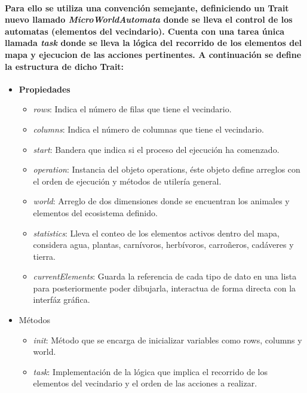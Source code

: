     \paragraph{Para ello se utiliza una convención semejante, definiciendo un Trait nuevo llamado \textit{MicroWorldAutomata} donde se lleva el control de los automatas (elementos del vecindario). Cuenta con una tarea única llamada \textit{task} donde se lleva la lógica del recorrido de los elementos del mapa y ejecucion de las acciones pertinentes. A continuación se define la estructura de dicho Trait:}
      \begin{itemize}
        \item{\textbf{Propiedades}}
            \begin{itemize}
              \item{\textit{rows}: Indica el número de filas que tiene el vecindario.}
              \item{\textit{columns}: Indica el número de columnas que tiene el vecindario.}
              \item{\textit{start}: Bandera que indica si el proceso del ejecución ha comenzado.}
              \item{\textit{operation}: Instancia del objeto operations, éste objeto define arreglos con el orden de ejecución y métodos de utilería general.}
              \item{\textit{world}: Arreglo de dos dimensiones donde se encuentran los animales y elementos del ecosistema definido.}
              \item{\textit{statistics}: Lleva el conteo de los elementos activos dentro del mapa, considera agua, plantas, carnívoros, herbívoros, carroñeros, cadáveres y tierra.}
              \item{\textit{currentElements}: Guarda la referencia de cada tipo de dato en una lista para posteriormente poder dibujarla, interactua de forma directa con la interfáz gráfica.}
            \end{itemize}
          \item{Métodos}
            \begin{itemize}            
              \item{\textit{init}: Método que se encarga de inicializar variables como rows, columns y world.}
              \item{\textit{task}: Implementación de la lógica que implica el recorrido de los elementos del vecindario y el orden de las acciones a realizar.}            
            \end{itemize}        
      \end{itemize}
